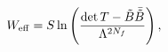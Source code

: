 \begin{equation}\label{Eq:Weff_SQCD}
W_{\rm eff}=S 
\ln\left(
\frac{
	\det T-{\tilde B}{\bar {\tilde B}}
}
{
	\Lambda^{2N_f}
}
\right),
\end{equation}

